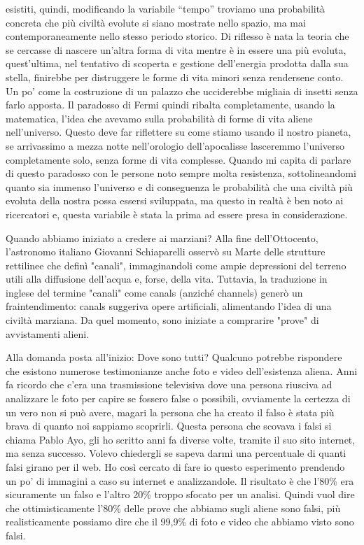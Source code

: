 \documentclass[12pt]{book} %
\begin{document}
\begin{mdframed}[linewidth=1pt]
esistiti, quindi, modificando la variabile “tempo” troviamo una probabilità concreta che più civiltà evolute si siano
mostrate nello spazio, ma mai contemporaneamente nello stesso periodo storico. Di riflesso è nata la teoria che se
cercasse di nascere un'altra forma di vita mentre è in essere una più evoluta,
quest'ultima, nel tentativo di scoperta e gestione dell'energia prodotta
dalla sua stella, finirebbe per distruggere le forme di vita minori senza rendersene conto. Un po' come la costruzione
di un palazzo che ucciderebbe migliaia di insetti senza farlo apposta. Il paradosso di Fermi quindi ribalta
completamente, usando la matematica, l'idea che avevamo sulla probabilità di forme di vita aliene
nell'universo. Questo deve far riflettere su come stiamo usando il nostro pianeta, se arrivassimo
a mezza notte nell'orologio dell'apocalisse lasceremmo
l'universo completamente solo, senza forme di vita complesse. Quando mi capita di parlare di
questo paradosso con le persone noto sempre molta resistenza, sottolineandomi quanto sia immenso
l'universo e di conseguenza le probabilità che una civiltà più evoluta della nostra possa essersi
sviluppata, ma questo in realtà è ben noto ai ricercatori e, questa variabile è stata la prima ad essere presa in
considerazione.

Quando abbiamo iniziato a credere ai marziani?
Alla fine dell’Ottocento, l’astronomo italiano Giovanni Schiaparelli osservò su Marte delle strutture rettilinee che definì "canali", immaginandoli come ampie depressioni del terreno utili alla diffusione dell’acqua e, forse, della vita. Tuttavia, la traduzione in inglese del termine "canali" come canals (anziché channels) generò un fraintendimento: canals suggeriva opere artificiali, alimentando l’idea di una civiltà marziana. Da quel momento, sono iniziate a comprarire "prove" di avvistamenti alieni.

Alla domanda posta all'inizio: Dove sono tutti? Qualcuno potrebbe rispondere che esistono numerose
testimonianze anche foto e video dell'esistenza aliena. Anni fa ricordo che
c'era una trasmissione televisiva dove una persona riusciva ad analizzare le foto per capire se
fossero false o possibili, ovviamente la certezza di un vero non si può avere, magari la persona che ha creato il falso
è stata più brava di quanto noi sappiamo scoprirli. Questa persona che scovava i falsi si chiama Pablo Ayo, gli ho
scritto anni fa diverse volte, tramite il suo sito internet, ma senza successo. Volevo chiedergli se sapeva darmi una
percentuale di quanti falsi girano per il web. Ho così cercato di fare io questo esperimento prendendo un po' di
immagini a caso su internet e analizzandole. Il risultato è che l'80\% era sicuramente un falso e
l'altro 20\% troppo sfocato per un analisi. Quindi vuol dire che ottimisticamente
l'80\% delle prove che abbiamo sugli aliene sono falsi, più realisticamente possiamo dire che il
99,9\% di foto e video che abbiamo visto sono falsi.


\end{mdframed}
\end{document}
